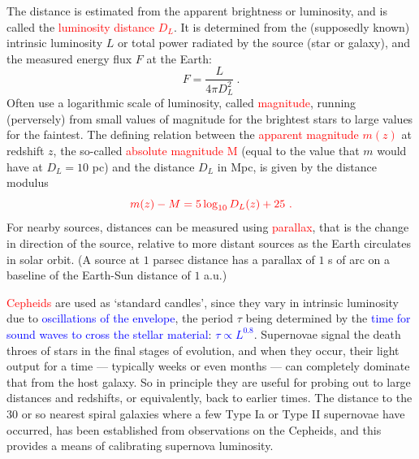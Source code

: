\documentclass[12pt,a4paper]{article}
\begin{document}
The distance is estimated from the apparent brightness or luminosity, and is called the \textcolor{red}{luminosity distance $D_L$}. It is determined from the (supposedly known) intrinsic luminosity $L$ or total power radiated by the source (star or galaxy), and the measured energy flux $F$ at the Earth:
\begin{equation}
F = \dfrac{L}{4\pi D_L^2} ~.
\end{equation}
Often use a logarithmic scale of luminosity, called \textcolor{red}{magnitude}, running (perversely) from small values of magnitude for the brightest stars to large values for the faintest. The defining relation between the \textcolor{red}{apparent magnitude $m(z)$} at redshift $z$, the so-called \textcolor{red}{absolute magnitude M} (equal to the value that $m$ would have at $D_L = 10$ pc) and the distance $D_L$ in Mpc, is given by the distance modulus
\begin{equation}
\color{red} m(z) - M = 5 \log_{10} D_L(z) +25 ~.
\end{equation}
For nearby sources, distances can be measured using \textcolor{red}{parallax}, that is the change in direction of the source, relative to more distant sources as the Earth circulates in solar orbit. (A source at $1$ parsec distance has a parallax of $1$ s of arc on a baseline of the Earth-Sun distance of $1$ a.u.) 

\textcolor{red}{Cepheids} are used as `standard candles', since they vary in intrinsic luminosity due to \textcolor{blue}{oscillations of the envelope}, the period $\tau$ being determined by the \textcolor{blue}{time for sound waves to cross the stellar material}: \textcolor{blue}{$\tau \propto L^{0.8}$}. Supernovae signal the death throes of stars in the final stages of evolution, and when they occur, their light output for a time --- typically weeks or even months --- can completely dominate that from the host galaxy. So in principle they are useful for probing out to large distances and redshifts, or equivalently, back to earlier times. The distance to the $30$ or so nearest spiral galaxies where a few Type Ia or Type II supernovae have occurred, has been established from observations on the Cepheids, and this provides a means of calibrating supernova luminosity.
\end{document}
